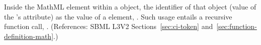 Inside the  MathML element within a \FunctionDefinition
object,  the identifier of that object (\ie value of the
\FunctionDefinition's  attribute)  as the value of a
 element, .  Such usage entails a recursive function call, .  (References: SBML L3V2
Sections~\ref{sec:ci-token} and~\ref{sec:function-definition-math}.)
